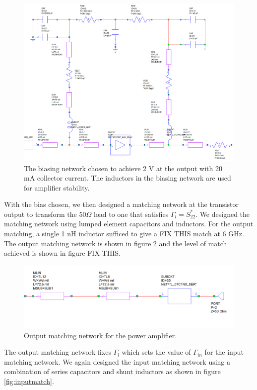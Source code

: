 \documentclass[twocolumn, aps, floatfix]{revtex4-1}
\begin{document}
\begin{figure}
    \centering
    \includegraphics[scale=0.6]{Biasing_Network.png}
    \caption{The biasing network chosen to achieve 2 V at the output with 20 mA collector current. The inductors in the biasing network are used for amplifier stability.}
    \label{fig:ampbiasschematic}
\end{figure}

With the bias chosen, we then designed a matching network at the transistor output to transform the $50 \Omega$ load to one that satisfies $\Gamma_l = S_{22}^*$. We designed the matching network using lumped element capacitors and inductors. For the output matching, a single 1 nH inductor sufficed to give a FIX THIS match at 6 GHz. The output matching network is shown in figure \ref{fig:outputmatch} and the level of match achieved is shown in figure FIX THIS.


\begin{figure}
    \centering
    \includegraphics[scale=0.4]{output_matching_network.png}
    \caption{Output matching network for the power amplifier.}
    \label{fig:outputmatch}
\end{figure}


The output matching network fixes $\Gamma_l$ which sets the value of $\Gamma_{in}$ for the input matching network. We again designed the input matching network using a combination of series capacitors and shunt inductors as shown in figure \ref{fig:inputmatch}. 
\end{document}
